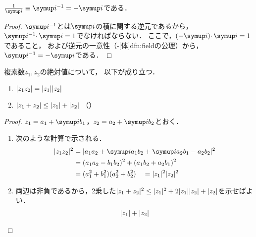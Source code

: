 \documentclass[../sotsu.tex]{subfiles}
\begin{document}
\begin{proposition}
    $\frac{1}{\iu} \equiv \iu^{-1} = -\iu$である．
\end{proposition}

\begin{proof}
    $\iu^{-1}$とは$\iu$の積に関する逆元であるから，
    $\iu^{-1} \cdotp \iu = 1$でなければならない．
    ここで，$(-\iu) \cdotp \iu = 1$であること，
    および逆元の一意性（-[体]{dfn:field}の公理）から，$\iu^{-1} = -\iu$である．
\end{proof}

\begin{proposition}
    複素数$z_1, z_2$の絶対値について，
    以下が成り立つ．
    \begin{enumerate}
        \item $\lvert z_1 z_2\rvert = \lvert z_1\rvert \lvert z_2\rvert$
        \item $\lvert z_1 + z_2\rvert \leq \lvert z_1\rvert + \lvert z_2\rvert$
            （）
    \end{enumerate}
\end{proposition}

\begin{proof}
    $z_1 = a_1 + \iu b_1$，$z_2 = a_2 + \iu b_2$とおく．
    \begin{enumerate}
        \item 次のような計算で示される．
            \begin{equation*}
                \begin{split}
                    \abs{z_1 z_2}^2 
                        &= \abs{ a_1 a_2 + \iu a_1 b_2 + \iu a_2 b_1 - a_2 b_2 }^2   \\
                        &= (a_1 a_2 - b_1 b_2)^2 + (a_1 b_2 + a_2 b_1)^2   \\
                        &= (a_1^2 + b_1^2) (a_2^2 + b_2^2)
                        \quad = \abs{z_1}^2 \abs{z_2}^2
                \end{split}
            \end{equation*}
        \item 両辺は非負であるから，2乗した$\lvert z_1 + z_2\rvert^2 \leq \lvert z_1\rvert^2 + 2 \lvert z_1\rvert \lvert z_2\rvert + \lvert z_2\rvert$を示せばよい．
            \begin{equation*}
                \begin{split}
                    \lvert z_1\rvert + \lvert z_2\rvert
                \end{split}
            \end{equation*}
    \end{enumerate}
\end{proof}
\end{document}
